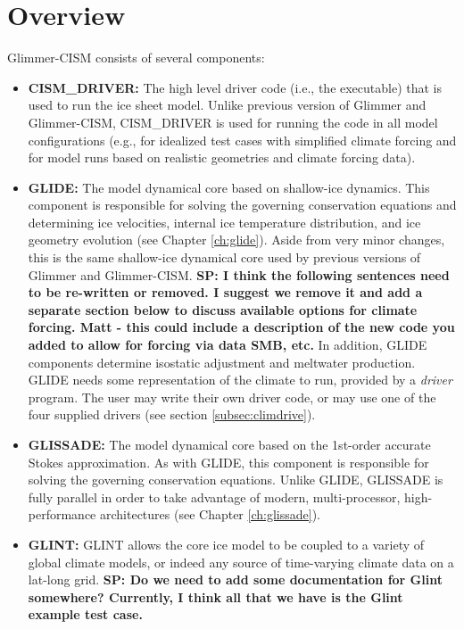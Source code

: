 \section{Overview}
%
Glimmer-CISM consists of several components:
%
\begin{itemize}

\item {\bf CISM\_DRIVER:} The high level driver code (i.e., the executable) that is used to run the ice sheet model. Unlike previous version of Glimmer and Glimmer-CISM, CISM\_DRIVER is used
for running the code in all model configurations (e.g., for idealized test cases with simplified climate forcing and for model runs based on realistic geometries and climate forcing data).  

\item {\bf GLIDE:} The model dynamical core based on shallow-ice dynamics. This component is responsible for solving the governing conservation equations and determining ice velocities, internal ice temperature distribution, and ice geometry evolution (see Chapter \ref{ch:glide}). Aside from very minor changes, this is the same shallow-ice dynamical core used by previous versions of Glimmer and Glimmer-CISM. \textbf{SP: I think the following sentences need to be re-written or removed. I suggest we remove it and add a separate section below to discuss available options for climate forcing. Matt - this could include a description of the new code you added to allow for forcing via data SMB, etc.} In addition, GLIDE components determine isostatic adjustment and meltwater production. GLIDE needs some representation of the climate to run, provided by a {\it driver} program. The user may write their own driver code, or may use one of the four supplied drivers (see section \ref{subsec:climdrive}). 

\item {\bf GLISSADE:} The model dynamical core based on the 1st-order accurate Stokes approximation. As with GLIDE, this component is responsible for solving the governing conservation equations. Unlike GLIDE, GLISSADE is fully parallel in order to take advantage of modern, multi-processor, high-performance architectures (see Chapter \ref{ch:glissade}).

\item {\bf GLINT:} GLINT allows the core ice model to be coupled to a variety of global climate models, or indeed any source of time-varying climate data on a lat-long grid. \textbf{SP: Do we need to add some documentation for Glint somewhere? Currently, I think all that we have is the Glint example test case.}


\end{itemize}
